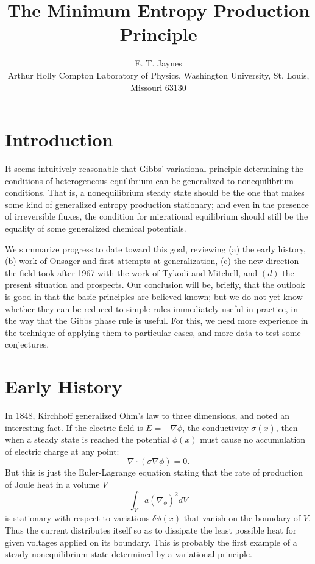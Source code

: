 \documentclass{article}
\title{The Minimum Entropy Production Principle}
\author{E. T. Jaynes\\
Arthur Holly Compton Laboratory of Physics, Washington University, St. Louis, Missouri 63130}
\begin{document}
\maketitle


\section{Introduction}

It seems intuitively reasonable that Gibbs' variational principle determining the conditions of heterogeneous equilibrium can be generalized to nonequilibrium conditions. That is, a nonequilibrium steady state should be the one that makes some kind of generalized entropy production stationary; and even in the presence of irreversible fluxes, the condition for migrational equilibrium should still be the equality of some generalized chemical potentials.

We summarize progress to date toward this goal, reviewing (a) the early history, (b) work of Onsager and first attempts at generalization, (c) the new direction the field took after 1967 with the work of Tykodi and Mitchell, and $(d)$ the present situation and prospects. Our conclusion will be, briefly, that the outlook is good in that the basic principles are believed known; but we do not yet know whether they can be reduced to simple rules immediately useful in practice, in the way that the Gibbs phase rule is useful. For this, we need more experience in the technique of applying them to particular cases, and more data to test some conjectures.

\section{Early History}

In 1848, Kirchhoff \cite{kirchhoff1848} generalized Ohm's law to three dimensions, and noted an interesting fact. If the electric field is $E=-\nabla \phi$, the conductivity $\sigma(x)$, then when a steady state is reached the potential $\phi(x)$ must cause no accumulation of electric charge at any point:
\begin{equation}
\nabla \cdot(\sigma \nabla \phi)=0.
\end{equation}
But this is just the Euler-Lagrange equation stating that the rate of production of Joule heat in a volume $V$
\begin{equation}
\int_V a\left(\nabla_\phi\right)^2 d V
\end{equation}
is stationary with respect to variations $\delta \phi(x)$ that vanish on the boundary of $V$. Thus the current distributes itself so as to dissipate the least possible heat for given voltages applied on its boundary. This is probably the first example of a steady nonequilibrium state determined by a variational principle.
\end{document}
